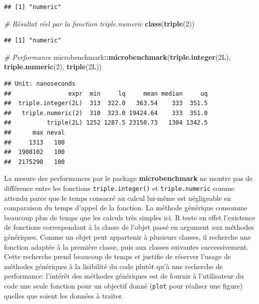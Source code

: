 \documentclass[
  12pt,
  french,
  a4paper,
  extrafontsizes,onecolumn,openright
  ]{memoir}
\newenvironment{Shaded}{\begin{snugshade}}{\end{snugshade}}
\newcommand{\CommentTok}[1]{\textcolor[rgb]{0.56,0.35,0.01}{\textit{#1}}}
\newcommand{\DecValTok}[1]{\textcolor[rgb]{0.00,0.00,0.81}{#1}}
\newcommand{\KeywordTok}[1]{\textcolor[rgb]{0.13,0.29,0.53}{\textbf{#1}}}
\newcommand{\NormalTok}[1]{#1}
\newcommand{\OperatorTok}[1]{\textcolor[rgb]{0.81,0.36,0.00}{\textbf{#1}}}
\newlength{\rf}
\begin{document}
\begin{verbatim}
## [1] "numeric"
\end{verbatim}

\begin{Shaded}
\begin{Highlighting}[]
\CommentTok{# Résultat réel par la fonction triple.numeric}
\KeywordTok{class}\NormalTok{(}\KeywordTok{triple}\NormalTok{(}\DecValTok{2}\NormalTok{))}
\end{Highlighting}
\end{Shaded}

\begin{verbatim}
## [1] "numeric"
\end{verbatim}

\begin{Shaded}
\begin{Highlighting}[]
\CommentTok{# Performance}
\NormalTok{microbenchmark}\OperatorTok{::}\KeywordTok{microbenchmark}\NormalTok{(}\KeywordTok{triple.integer}\NormalTok{(2L), }\KeywordTok{triple.numeric}\NormalTok{(}\DecValTok{2}\NormalTok{), }
    \KeywordTok{triple}\NormalTok{(2L))}
\end{Highlighting}
\end{Shaded}

\begin{verbatim}
## Unit: nanoseconds
##                expr  min     lq     mean median     uq
##  triple.integer(2L)  313  322.0   363.54    333  351.5
##   triple.numeric(2)  310  323.0 19424.64    333  351.0
##          triple(2L) 1252 1287.5 23150.73   1304 1342.5
##      max neval
##     1313   100
##  1908102   100
##  2175298   100
\end{verbatim}

\normalsize

La mesure des performances par le package \textbf{microbenchmark} ne montre pas de différence entre les fonctions \texttt{triple.integer()} et \texttt{triple.numeric} comme attendu parce que le temps consacré au calcul lui-même est négligeable en comparaison du temps d'appel de la fonction.
La méthode générique consomme beaucoup plus de temps que les calculs très simples ici.
R teste en effet l'existence de fonctions correspondant à la classe de l'objet passé en argument aux méthodes génériques.
Comme un objet peut appartenir à plusieurs classes, il recherche une fonction adaptée à la première classe, puis aux classes suivantes successivement.
Cette recherche prend beaucoup de temps et justifie de réserver l'usage de méthodes génériques à la lisibilité du code plutôt qu'à une recherche de performance: l'intérêt des méthodes génériques est de fournir à l'utilisateur du code une seule fonction pour un objectif donné (\texttt{plot} pour réaliser une figure) quelles que soient les données à traiter.
\end{document}
